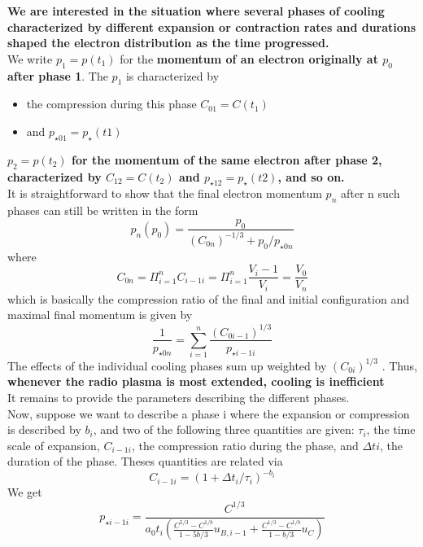 \documentclass[12pt]{report}
\newcommand{\tbf}[1]{\textbf{#1}}
\newcommand{\cc}[1]{\left({#1}\right)}
\begin{document}
\tbf{We are interested in the situation where several phases of cooling characterized by different expansion or contraction rates and durations shaped the electron distribution as the time progressed.}\\

 We write $ p_1 = p(t_1)$ for the \tbf{momentum of an electron originally at $p_0$ after phase 1}. The $p_1$ is characterized by
\begin{itemize}
\item the compression during this phase $C_{0 1} = C(t_1)$
\item and $p_{\star 0 1} = p_\star(t1)$
\end{itemize} 
   \tbf{$p_2=p(t_2)$ for the momentum of the same electron after phase 2, characterized by $C_{1 2}=C(t_2)$ and $p_{\star1 2}=p_\star(t2)$, and so on.}\\
 It is straightforward to show that the final electron momentum $p_n$ after n such phases can still be written in the form
 \begin{equation}
 p_n(p_0)=\frac{p_0}{(C_{0n})^{-1/3}+p_0/p_{\star 0n}}
 \end{equation}
 where 
 \begin{equation}
 C_{0n}=\Pi_{i=1} ^nC_{i-1i}=\Pi^n _{i=1}\frac{V_i-1}{V_i}=\frac{V_0}{V_n}
 \end{equation}
which is basically the compression ratio of the final and initial configuration and maximal final momentum is given by
\begin{equation}
\frac{1}{p_{\star 0n}}=\sum^n _{i=1}\frac{(C_{0i-1})^{1/3}}{p_{\star i-1 i}}
\end{equation}
The effects of the individual cooling phases sum up weighted by $(C_{0 i}) ^{1/3}$ . Thus, \textbf{whenever the radio plasma is most extended, cooling is inefficient}\\
It remains to provide the parameters describing the different phases.\\ Now, suppose we want to describe a phase i where the expansion or compression is described by $b_i$, and two of the following three quantities are given: $\tau_i$, the time scale of expansion, $C_{i-1i}$, the compression ratio during the phase, and $\Delta ti$, the duration of the phase. Theses quantities are related via 
\begin{equation}\label{eqCi}
C_{i-1i}=(1+\Delta t_i/\tau_i)^{-b_i}
\end{equation}
We get
\begin{equation}\label{eqpdisi}
p_{\star i-1i}=\frac{C^{1/3}}{a_0t_i\cc{\frac{C^{5/3}-C^{1/b}}{1-5b/3} u_{B,i-1}+\frac{C^{1/3}-C^{1/b}}{1-b/3} u_{C}}}
\end{equation}
\end{document}
